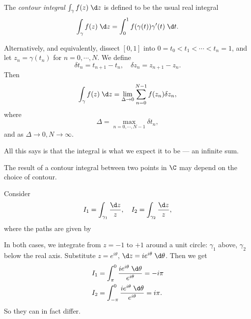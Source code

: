 \documentclass[a4paper]{article}
\begin{document}
\begin{defi}
  The \emph{contour integral} $\int_\gamma f(z)\;\d z$ is defined to be the usual real integral
  \[
    \int_\gamma f(z)\;\d z= \int_0^1 f(\gamma(t)) \gamma'(t)\;\d t.
  \]
\end{defi}
Alternatively, and equivalently, dissect $[0, 1]$ into $0 = t_0 < t_1 < \cdots < t_n = 1$, and let $z_n = \gamma(t_n)$ for $n = 0, \cdots, N$. We define
\[
  \delta t_n = t_{n + 1} - t_n,\quad \delta z_n = z_{n + 1} - z_n.
\]
Then
\[
  \int_\gamma f(z)\;\d z = \lim_{\Delta \to 0} \sum_{n = 0}^{N - 1} f(z_n) \delta z_n,
\]
where
\[
  \Delta = \max_{n = 0, \cdots, N - 1} \delta t_n,
\]
and as $\Delta \to 0, N \to \infty$.

All this says is that the integral is what we expect it to be --- an infinite sum.

The result of a contour integral between two points in $\C$ may depend on the choice of contour.
\begin{eg}
  Consider
  \[
    I_1 = \int_{\gamma_1} \frac{\d z}{z},\quad I_2 = \int_{\gamma_2} \frac{\d z}{z},
  \]
  where the paths are given by
  \begin{center}
  \end{center}
  In both cases, we integrate from $z = -1$ to $+1$ around a unit circle: $\gamma_1$ above, $\gamma_2$ below the real axis. Substitute $z = e^{i\theta}$, $\d z = ie^{i\theta} \;\d \theta$. Then we get
  \begin{align*}
    I_1 &= \int_{\pi}^0 \frac{ie^{i\theta}\;\d \theta}{e^{i\theta}} = -i\pi\\
    I_2 &= \int_{-\pi}^0 \frac{ie^{i\theta}\;\d \theta}{e^{i\theta}} = i\pi.
  \end{align*}
  So they can in fact differ.
\end{eg}
\end{document}
